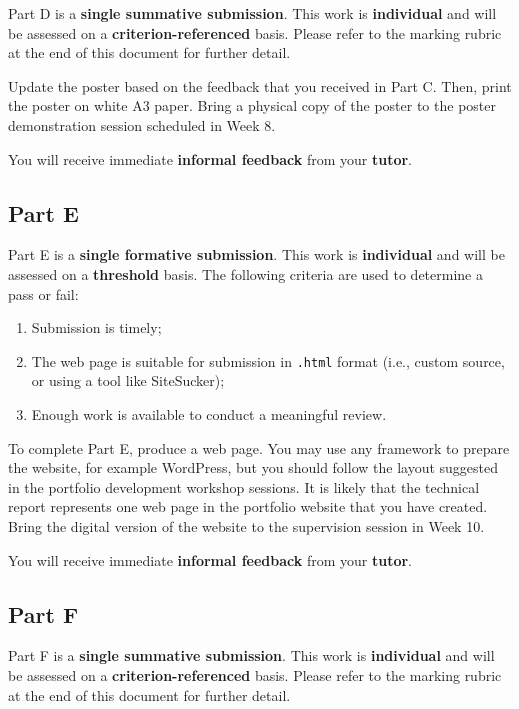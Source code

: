 \documentclass{../../fal_assignment}
\begin{document}
Part D is a \textbf{single summative submission}. This work is \textbf{individual} and will be assessed on a \textbf{criterion-referenced} basis.  Please refer to the marking rubric at the end of this document for further detail.

Update the poster based on the feedback that you received in Part C. Then, print the poster on white A3 paper. Bring a physical copy of the poster to the poster demonstration session scheduled in Week 8.

You will receive immediate \textbf{informal feedback} from your \textbf{tutor}.

\subsection*{Part E}

Part E is a \textbf{single formative submission}. This work is \textbf{individual} and will be assessed on a \textbf{threshold} basis.  The following criteria are used to determine a pass or fail:

\begin{enumerate}[label=(\alph*)]
	\item Submission is timely;
	\item The web page is suitable for submission in \texttt{.html} format (i.e., custom source, or using a tool like SiteSucker);
	\item Enough work is available to conduct a meaningful review.
\end{enumerate}

To complete Part E, produce a web page. You may use any framework to prepare the website, for example WordPress, but you should follow the layout suggested in the portfolio development workshop sessions. It is likely that the technical report represents one web page in the portfolio website that you have created.  Bring the digital version of the website to the supervision session in Week 10.

You will receive immediate \textbf{informal feedback} from your \textbf{tutor}.

\subsection*{Part F}

Part F is a \textbf{single summative submission}. This work is \textbf{individual} and will be assessed on a \textbf{criterion-referenced} basis.  Please refer to the marking rubric at the end of this document for further detail.
\end{document}

